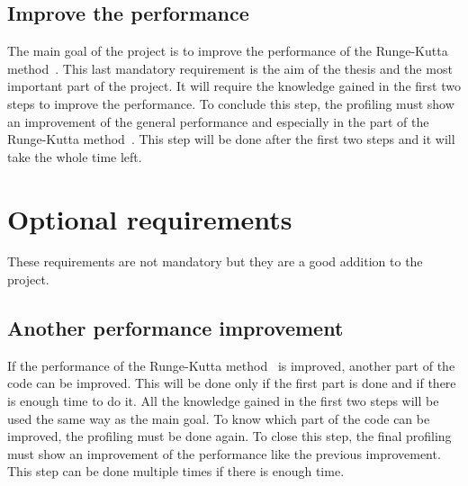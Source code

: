 \subsection{Improve the performance}
\label{spec:ch:goals:mandatory-requirements:improve-the-performance}

The main goal of the project is to improve the performance of the Runge-Kutta method~\cite{Runge-Kutta-methods}.
This last mandatory requirement is the aim of the thesis and the most important part of the project.
It will require the knowledge gained in the first two steps to improve the performance.
To conclude this step, the profiling must show an improvement of the general performance and especially in the part of the Runge-Kutta method~\cite{Runge-Kutta-methods}.
This step will be done after the first two steps and it will take the whole time left.


\section{Optional requirements}
\label{spec:ch:goals:optional-requirements}

These requirements are not mandatory but they are a good addition to the project.

\subsection{Another performance improvement}
\label{spec:ch:goals:optional-requirements:another-performance-improvement}

If the performance of the Runge-Kutta method~\cite{Runge-Kutta-methods} is improved, another part of the code can be improved.
This will be done only if the first part is done and if there is enough time to do it.
All the knowledge gained in the first two steps will be used the same way as the main goal.
To know which part of the code can be improved, the profiling must be done again.
To close this step, the final profiling must show an improvement of the performance like the previous improvement.
This step can be done multiple times if there is enough time.

